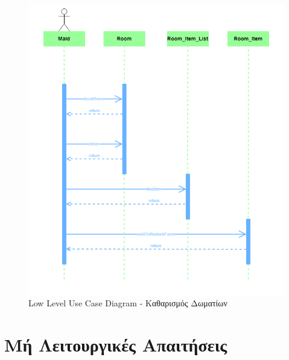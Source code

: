 \begin{figure}[H]
	\centering
	\includegraphics[width=1\textwidth]{Images/Sequence-Room cleaning}
	\caption{Low Level Use Case Diagram - Καθαρισμός Δωματίων}
	\label{Activity- Room cleaning}
\end{figure}

\section{Μή Λειτουργικές Απαιτήσεις}
